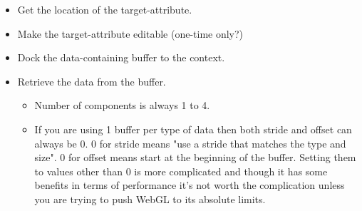 \begin{itemize}
    \item Get the location of the target-attribute. 
    \item Make the target-attribute editable (one-time only?) 
    \item Dock the data-containing buffer to the context. 
    \item Retrieve the data from the buffer.  
        \begin{itemize}
            \item Number of components is always 1 to 4. 
            \item If you are using 1 buffer per type of data then both stride and offset can always be 0. 0 for stride means "use a stride that matches the type and size". 0 for offset means start at the beginning of the buffer. Setting them to values other than 0 is more complicated and though it has some benefits in terms of performance it's not worth the complication unless you are trying to push WebGL to its absolute limits.
        \end{itemize}
\end{itemize}



